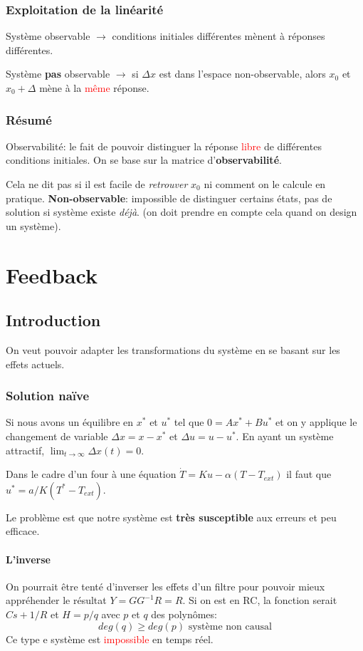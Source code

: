 \documentclass{report}
\begin{document}
\subsection{Exploitation de la linéarité}
Système observable $\rightarrow$ conditions initiales différentes mènent à réponses différentes.\par 
Système \textbf{pas} observable $\rightarrow$ si $\Delta x$ est dans l'espace non-observable, alors $x_0$ et $x_0 + \Delta$ mène à la \textcolor{red}{même} réponse.

\subsection{Résumé}
Observabilité: le fait de pouvoir distinguer la réponse \textcolor{red}{libre} de différentes conditions initiales. On se base sur la matrice d'\textbf{observabilité}.\par 
Cela ne dit pas si il est facile de \textit{retrouver} $x_0$ ni comment on le calcule en pratique. \textbf{Non-observable}: impossible de distinguer certains états, pas de solution si système existe \textit{déjà}. (on doit prendre en compte cela quand on design un système).

\chapter{Feedback}
\section{Introduction}
On veut pouvoir adapter les transformations du système en se basant sur les effets actuels.

\subsection{Solution naïve}
Si nous avons un équilibre en $x^*$ et $u^*$ tel que $0 = Ax^* + Bu^*$ et on y applique le changement de variable $\Delta x = x - x^*$ et $\Delta u = u - u^*$. En ayant un système attractif, $\lim_{t \rightarrow \infty} \Delta x (t) = 0$.\par
Dans le cadre d'un four à une équation $\dot{T} = Ku -\alpha (T-T_{ext})$ il faut que $u^* = a/K (T^* - T_{ext})$.\par 
Le problème est que notre système est \textbf{très susceptible} aux erreurs et peu efficace.

\subsubsection{L'inverse}
On pourrait être tenté d'inverser les effets d'un filtre pour pouvoir mieux appréhender le résultat $Y = GG^{-1}R = R$. Si on est en RC, la fonction serait $Cs + 1/R$ et $H = p/q$ avec $p$ et $q$ des polynômes:
\begin{equation}
deg(q) \geqslant deg(p) \text{ système non causal}
\end{equation}
Ce type e système est \textcolor{red}{impossible} en temps réel.\par 
\end{document}
